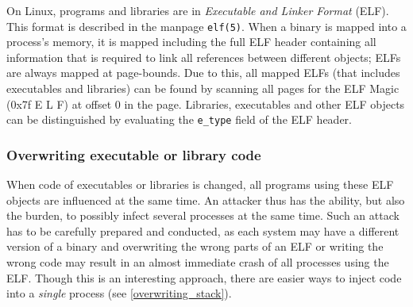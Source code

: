 On Linux, programs and libraries are in \emph{Executable and Linker Format}
(ELF).  This format is described in the manpage \texttt{elf(5)}. When a binary
is mapped into a process's memory, it is mapped including the full ELF header
containing all information that is required to link all references between
different objects; ELFs are always mapped at page-bounds. Due to this, all
mapped ELFs (that includes executables and libraries) can be found by scanning
all pages for the ELF Magic (0x7f E L F) at offset $0$ in the page.  Libraries,
executables and other ELF objects can be distinguished by evaluating the
\texttt{e\_type} field of the ELF header.

\subsubsection{Overwriting executable or library code}

When code of executables or libraries is changed, all programs using these ELF
objects are influenced at the same time. An attacker thus has the ability, but
also the burden, to possibly infect several processes at the same time. Such an
attack has to be carefully prepared and conducted, as each system may have a
different version of a binary and overwriting the wrong parts of an ELF or
writing the wrong code may result in an almost immediate crash of all processes
using the ELF. Though this is an interesting approach, there are easier ways to
inject code into a \emph{single} process (see \ref{overwriting_stack}).

